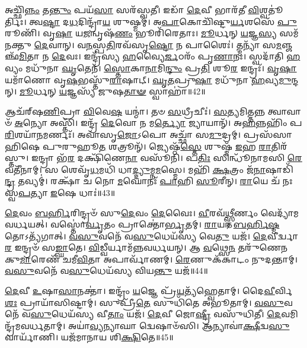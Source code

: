 𑌅𑌚𑍍𑌛𑌿᳴\-\ul{𑌨𑍍𑌨𑌂} 𑌤\-\ul{𑌨𑍍𑌤𑍁𑌂} 𑌪𑌯᳴\-\ul{𑌸𑌾} 𑌸𑌰᳴𑌸𑍍𑌵𑌤𑍀।
𑌇𑌡𑌾᳴ \ul{𑌦𑍇}\-𑌵𑍀 𑌭𑌾𑌰᳴𑌤𑍀 \ul{𑌵𑌿}\-𑌶𑍍𑌵𑌤𑍂॑𑌰𑍍𑌤𑌿𑌃।
𑌤𑍍𑌵\-\ul{𑌷𑍍𑌟𑌾} 𑌦\-\ul{𑌧}\-𑌦𑌿𑌨𑍍𑌦𑍍𑌰𑌾᳴\-\ul{𑌯} 𑌶𑍁𑌷𑍍𑌮𑌮𑍍॑।
𑌅\-\ul{𑌪𑌾}\-𑌕𑍋𑌚𑌿᳴𑌷𑍍𑌟𑍁\-\ul{𑌰𑍍𑌯}\-𑌶𑌸𑍇᳴ \ul{𑌪𑍁}\-𑌰𑍂𑌣𑌿᳴।
𑌵𑍃\-\ul{𑌷𑌾} 𑌯\-\ul{𑌜}\-𑌨𑍍𑌵𑍃𑌷᳴\-\ul{𑌣𑌂} 𑌭𑍂𑌰𑌿᳴𑌰𑍇𑌤𑌾𑌃।
\-\ul{𑌮𑍂}\-𑌰𑍍𑌧𑌨𑍍 \ul{𑌯}\-𑌜𑍍𑌞\-\ul{𑌸𑍍𑌯} 𑌸𑌮᳴𑌨𑌕𑍍𑌤𑍁 \ul{𑌦𑍇}\-𑌵𑌾𑌨𑍍।
𑌵\-\ul{𑌨}\-𑌸𑍍𑌪\-\ul{𑌤𑌿}\-𑌰𑌵᳴𑌸𑍃\-\ul{𑌷𑍍𑌟𑍋} 𑌨 𑌪𑌾𑌶𑍈𑌃॑।
𑌤𑍍𑌮𑌨𑍍𑌯𑌾᳴ 𑌸\-\ul{𑌮}\-𑌞𑍍𑌜𑌞𑍍𑌛᳴\-\ul{𑌮𑌿}\-𑌤𑌾 𑌨 \ul{𑌦𑍇}\-𑌵𑌃।
𑌇𑌨𑍍𑌦𑍍𑌰᳴𑌸𑍍𑌯 \ul{𑌹}\-𑌵𑍍𑌯𑍈\-\ul{𑌰𑍍𑌜}\-𑌠𑌰𑌂᳴ 𑌪𑍃\-\ul{𑌣𑌾}\-𑌨𑌃।
𑌸𑍍𑌵𑌦𑌾᳴𑌤𑌿 \ul{𑌹}\-𑌵𑍍𑌯𑌂 𑌮𑌧𑍁᳴𑌨𑌾 \ul{𑌘𑍃}\-𑌤𑍇𑌨᳴।
\-\ul{𑌸𑍍𑌤𑍋}\-𑌕𑌾\-\ul{𑌨𑌾}\-𑌮𑌿\-\ul{𑌨𑍍𑌦𑍁𑌂} 𑌪𑍍𑌰\-\ul{𑌤𑌿} 𑌶𑍂\-\ul{𑌰} 𑌇𑌨𑍍𑌦𑍍𑌰𑌃᳴।
\-\ul{𑌵𑍃}\-\-\ul{𑌷𑌾}\-𑌯𑌮𑌾᳴𑌣𑍋 𑌵𑍃\-\ul{𑌷}\-𑌭𑌸𑍍𑌤𑍁᳴\-\ul{𑌰𑌾}\-𑌷𑌾𑌟𑍍।
\-\ul{𑌘𑍃}\-\-\ul{𑌤}\-𑌪𑍍𑌰𑍁\-\ul{𑌷𑌾} 𑌮𑌧𑍁᳴𑌨𑌾 \ul{𑌹}\-𑌵𑍍𑌯\-\ul{𑌮𑍁}\-𑌨𑍍𑌦𑌨𑍍।
\-\ul{𑌮𑍂}\-𑌰𑍍𑌧𑌨𑍍 \ul{𑌯}\-𑌜𑍍𑌞𑌸𑍍𑌯᳴ 𑌜𑍁𑌷\-\ul{𑌤𑌾}\-\-\ul{𑍟} 𑌸𑍍𑌵𑌾𑌹𑌾॑॥42॥\anuvakamend[𑌶𑌰𑍍𑌧᳴𑌮𑌾\-\ul{𑌨𑍋} 𑌮𑌹𑍋᳴\-\ul{𑌭𑌿𑌃} 𑌪𑌤𑍍𑌨𑍀॑\-\ul{𑌰𑍍𑌘𑍃}\-𑌤𑍇𑌨᳴ \ul{𑌚}\-𑌤𑍍𑌵𑌾𑌰𑌿᳴ 𑌚]

𑌆𑌚᳴𑌰𑍍‌\mbox{}𑌷\-\ul{𑌣𑌿}\-𑌪𑍍𑌰𑌾 \ul{𑌵𑌿}\-𑌵𑍇\-\ul{𑌷} 𑌯𑌨𑍍𑌮𑌾॑।
𑌤𑍞 \ul{𑌸}\-𑌧𑍍𑌰𑍀𑌚𑍀𑌃॑।
\-\ul{𑌸}\-𑌤𑍍𑌯𑌮𑌿𑌤𑍍𑌤𑌨𑍍𑌨 𑌤𑍍𑌵𑌾𑌵𑌾𑍞᳴ \ul{𑌅}\-𑌨𑍍𑌯𑍋 𑌅𑌸𑍍𑌤𑌿᳴।
𑌇𑌨𑍍𑌦𑍍𑌰᳴ \ul{𑌦𑍇}\-𑌵𑍋 𑌨 𑌮\-\ul{𑌰𑍍𑌤𑍍𑌯𑍋} 𑌜𑍍𑌯𑌾𑌯𑌾𑌨𑍍᳴।
𑌅\-\ul{𑌹}\-𑌨𑍍𑌨𑌹𑌿𑌂᳴ 𑌪\-\ul{𑌰𑌿}\-𑌶𑌯𑌾᳴\-\ul{𑌨}\-𑌮𑌰𑍍𑌣𑌃᳴।
𑌅𑌵𑌾᳴𑌸𑍃\-\ul{𑌜𑍋}\-𑌽𑌪𑍋 𑌅𑌚𑍍𑌛𑌾᳴ 𑌸\-\ul{𑌮𑍁}\-𑌦𑍍𑌰𑌮𑍍।
𑌪𑍍𑌰𑌸᳴𑌸𑌾𑌹𑌿𑌷𑍇 𑌪𑍁𑌰𑍁𑌹𑍂\-\ul{𑌤} 𑌶𑌤𑍍𑌰𑍂𑌨𑍍᳴।
𑌜𑍍𑌯𑍇𑌷𑍍𑌠᳴\-\ul{𑌸𑍍𑌤𑍇} 𑌶𑍁𑌷𑍍𑌮᳴ \ul{𑌇}\-𑌹 \ul{𑌰𑌾}\-𑌤𑌿𑌰᳴𑌸𑍍𑌤𑍁।
𑌇𑌨𑍍𑌦𑍍𑌰𑌾 𑌭᳴\-\ul{𑌰} 𑌦𑌕𑍍𑌷𑌿᳴𑌣𑍇\-\ul{𑌨𑌾} 𑌵𑌸𑍂᳴𑌨𑌿।
𑌪\-\ul{𑌤𑌿𑌃} 𑌸𑌿𑌨𑍍𑌧𑍂᳴𑌨𑌾𑌮𑌸𑌿 \ul{𑌰𑍇}\-𑌵𑌤𑍀᳴𑌨𑌾𑌮𑍍।
𑌸 𑌶𑍇𑌵𑍃᳴\-\ul{𑌧}\-𑌮𑌧𑌿᳴ 𑌧𑌾\-\ul{𑌦𑍍𑌦𑍍𑌯𑍁}\-𑌮𑍍𑌨\-\ul{𑌮}\-𑌸𑍍𑌮𑍇।
𑌮𑌹𑌿᳴ \ul{𑌕𑍍𑌷}\-𑌤𑍍𑌰𑌂 𑌜᳴\-\ul{𑌨𑌾}\-𑌷𑌾𑌡𑌿᳴\-\ul{𑌨𑍍𑌦𑍍𑌰} 𑌤𑌵𑍍𑌯𑌮𑍍॑।
𑌰𑌕𑍍𑌷𑌾᳴ 𑌚 𑌨𑍋 \ul{𑌮}\-𑌘𑍋𑌨𑌃᳴ \ul{𑌪𑌾}\-𑌹𑌿 \ul{𑌸𑍂}\-𑌰𑍀𑌨𑍍।
\-\ul{𑌰𑌾}\-𑌯𑍇 𑌚᳴ 𑌨𑌃 𑌸𑍍𑌵\-\ul{𑌪}\-𑌤𑍍𑌯𑌾 \ul{𑌇}\-𑌷𑍇 𑌧𑌾𑌃॑॥43॥\anuvakamend[\-\ul{𑌰𑍇}\-𑌵𑌤𑍀᳴𑌨𑌾𑌂 \ul{𑌚}\-𑌤𑍍𑌵𑌾𑌰𑌿᳴ 𑌚]

\-\ul{𑌦𑍇}\-𑌵𑌂 \ul{𑌬}\-\-\ul{𑌰𑍍}\-𑌹𑌿𑌰𑌿𑌨𑍍𑌦𑍍𑌰𑍞᳴ 𑌸𑍁\-\ul{𑌦𑍇}\-𑌵𑌂 \ul{𑌦𑍇}\-𑌵𑍈𑌃।
\-\ul{𑌵𑍀}\-𑌰𑌵᳴\-\ul{𑌥𑍍𑌸𑍍𑌤𑍀}\-𑌰𑍍𑌣𑌂 𑌵𑍇𑌦𑍍𑌯𑌾᳴𑌮𑌵𑌰𑍍𑌧𑌯𑌤𑍍।
𑌵𑌸𑍍𑌤𑍋॑\-\ul{𑌰𑍍𑌵𑍃}\-𑌤𑌂 𑌪𑍍𑌰𑌾𑌕𑍍𑌤𑍋॑\-\ul{𑌰𑍍𑌭𑍃}\-𑌤𑌮𑍍।
\-\ul{𑌰𑌾}\-𑌯𑌾 \ul{𑌬}\-\-\ul{𑌰𑍍}\-𑌹𑌿\-\ul{𑌷𑍍𑌮}\-𑌤𑍋\-𑌽𑌤𑍍𑌯᳴𑌗𑌾𑌤𑍍।
\-\ul{𑌵}\-\-\ul{𑌸𑍁}\-𑌵𑌨𑍇᳴ 𑌵\-\ul{𑌸𑍁}\-𑌧𑍇𑌯᳴𑌸𑍍𑌯 𑌵𑍇\-\ul{𑌤𑍁} 𑌯𑌜᳴।
\-\ul{𑌦𑍇}\-𑌵𑍀𑌰𑍍𑌦𑍍𑌵𑌾\-\ul{𑌰} 𑌇𑌨𑍍𑌦𑍍𑌰𑍞᳴ 𑌸\-\ul{𑌙𑍍𑌘𑌾}\-𑌤𑍇।
\-\ul{𑌵𑌿}\-𑌡𑍍𑌵𑍀𑌰𑍍𑌯𑌾𑌮᳴𑌨𑍍𑌨𑌵𑌰𑍍𑌧𑌯𑌨𑍍।
𑌆 \ul{𑌵}\-𑌥𑍍𑌸𑍇\-\ul{𑌨} 𑌤𑌰𑍁᳴𑌣𑍇𑌨 𑌕𑍁\-\ul{𑌮𑌾}\-𑌰𑍇𑌣᳴ 𑌚𑌮𑍀\-\ul{𑌵𑌿}\-𑌤𑌾 𑌅𑌪𑌾𑌰𑍍𑌵𑌾᳴𑌣𑌮𑍍।
\-\ul{𑌰𑍇}\-𑌣𑍁𑌕᳴𑌕𑌾𑌟𑌂 𑌨𑍁𑌦𑌨𑍍𑌤𑌾𑌮𑍍।
\-\ul{𑌵}\-\-\ul{𑌸𑍁}\-𑌵𑌨𑍇᳴ 𑌵\-\ul{𑌸𑍁}\-𑌧𑍇𑌯᳴𑌸𑍍𑌯 𑌵𑌿𑌯\-\ul{𑌨𑍍𑌤𑍁} 𑌯𑌜᳴॥44॥

\-\ul{𑌦𑍇}\-𑌵𑍀 \ul{𑌉}\-𑌷𑌾\-\ul{𑌸𑌾}\-𑌨𑌕𑍍𑌤𑌾॑।
𑌇𑌨𑍍𑌦𑍍𑌰𑌂᳴ \ul{𑌯}\-𑌜𑍍𑌞𑍇 𑌪𑍍𑌰᳴\-\ul{𑌯}\-𑌤𑍍𑌯᳴𑌹𑍍𑌵𑍇𑌤𑌾𑌮𑍍।
𑌦𑍈\-\ul{𑌵𑍀}\-𑌰𑍍𑌵𑌿\-\ul{𑌶𑌃} 𑌪𑍍𑌰𑌾𑌯𑌾᳴𑌸𑌿𑌷𑍍𑌟𑌾𑌮𑍍।
𑌸𑍁𑌪𑍍𑌰𑍀᳴\-\ul{𑌤𑍇} 𑌸𑍁𑌧𑌿᳴𑌤𑍇 𑌅𑌭𑍂𑌤𑌾𑌮𑍍।
\-\ul{𑌵}\-\-\ul{𑌸𑍁}\-𑌵𑌨𑍇᳴ 𑌵\-\ul{𑌸𑍁}\-𑌧𑍇𑌯᳴𑌸𑍍𑌯 𑌵𑍀\-\ul{𑌤𑌾𑌂} 𑌯𑌜᳴।
\-\ul{𑌦𑍇}\-𑌵𑍀 𑌜𑍋\-\ul{𑌷𑍍𑌟𑍍𑌰𑍀} 𑌵𑌸𑍁᳴𑌧𑌿𑌤𑍀।
\-\ul{𑌦𑍇}\-𑌵𑌮𑌿𑌨𑍍𑌦𑍍𑌰᳴𑌮𑌵𑌰𑍍𑌧𑌤𑌾𑌮𑍍।
𑌅𑌯𑌾॑\-\ul{𑌵𑍍𑌯}\-𑌨𑍍𑌯𑌾𑌘𑌾 𑌦𑍍𑌵𑍇𑌷𑌾𑍞᳴𑌸𑌿।
𑌆𑌨𑍍𑌯𑌾𑌵𑌾॑\-\ul{𑌕𑍍𑌷𑍀}\-𑌦𑍍𑌵\-\ul{𑌸𑍁} 𑌵𑌾𑌰𑍍𑌯𑌾᳴𑌣𑌿।
𑌯𑌜᳴𑌮𑌾𑌨𑌾𑌯 𑌶𑌿\-\ul{𑌕𑍍𑌷𑌿}\-𑌤𑍇॥45॥

